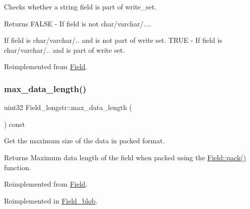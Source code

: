 Checks whether a string field is part of write\+\_\+set.

\begin{DoxyReturn}{Returns}
F\+A\+L\+SE -\/ If field is not char/varchar/....
\begin{DoxyItemize}
\item If field is char/varchar/.. and is not part of write set. T\+R\+UE -\/ If field is char/varchar/.. and is part of write set. 
\end{DoxyItemize}
\end{DoxyReturn}


Reimplemented from \mbox{\hyperlink{classField_a8b2061753bd4314da3955b7500119907}{Field}}.

\mbox{\label{classField__longstr_a5af463c25b00c34e0d14e3780771fee0}} 
\subsubsection{\texorpdfstring{max\+\_\+data\+\_\+length()}{max\_data\_length()}}
{\footnotesize\ttfamily uint32 Field\+\_\+longstr\+::max\+\_\+data\+\_\+length (\begin{DoxyParamCaption}{ }\end{DoxyParamCaption}) const\hspace{0.3cm}{\ttfamily [virtual]}}

Get the maximum size of the data in packed format.

\begin{DoxyReturn}{Returns}
Maximum data length of the field when packed using the \mbox{\hyperlink{classField_a9eaff8d3425ef0e1da69b32cbd8f2879}{Field\+::pack()}} function. 
\end{DoxyReturn}


Reimplemented from \mbox{\hyperlink{classField_ab628f9b9a6253a5b675c97095bf01aac}{Field}}.



Reimplemented in \mbox{\hyperlink{classField__blob_ae15f550d9b0f82acf200c45dc34caf07}{Field\+\_\+blob}}.

\mbox{\label{classField__longstr_accc080bab51e57cdcefc594a17cb13f5}} 
